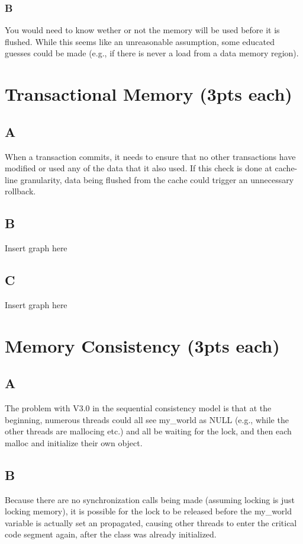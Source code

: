 \documentclass{article}
\begin{document}
\subsubsection{B}
You would need to know wether or not the memory will be used before it is flushed.  While this seems like an unreasonable assumption, some educated guesses could be made (e.g., if there is never a  load from a data memory region).

\section{Transactional Memory (3pts each)}
\subsection{A}
When a transaction commits, it needs to ensure that no other transactions have modified or used any of the data that it also used.  If this check is done at cache-line granularity, data being flushed from the cache could trigger an unnecessary rollback.

\subsection{B}
Insert graph here

\subsection{C}
Insert graph here

\section{Memory Consistency (3pts each)}
\subsection{A}
The problem with V3.0 in the sequential consistency model is that at the beginning, numerous threads could all see my\_world as NULL (e.g., while the other threads are mallocing etc.) and all be waiting for the lock, and then each malloc and initialize their own object.

\subsection{B}
Because there are no synchronization calls being made (assuming locking is just locking memory), it is possible for the lock to be released before the my\_world variable is actually set an propagated, causing other threads to enter the critical code segment again, after the class was already initialized.
\end{document}
